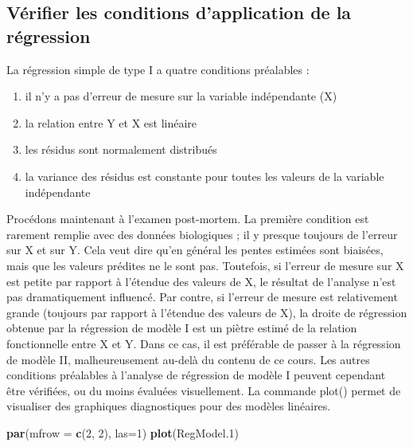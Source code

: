 \documentclass[12pt,]{book}
\newenvironment{Shaded}{\begin{snugshade}}{\end{snugshade}}
\newcommand{\DataTypeTok}[1]{\textcolor[rgb]{0.27,0.27,0.27}{#1}}
\newcommand{\DecValTok}[1]{\textcolor[rgb]{0.06,0.06,0.06}{#1}}
\newcommand{\FloatTok}[1]{\textcolor[rgb]{0.06,0.06,0.06}{#1}}
\newcommand{\KeywordTok}[1]{\textcolor[rgb]{0.27,0.27,0.27}{\textbf{#1}}}
\newcommand{\NormalTok}[1]{#1}
\providecommand{\tightlist}{%
  \setlength{\itemsep}{0pt}\setlength{\parskip}{0pt}}
\begin{document}
\hypertarget{vuxe9rifier-les-conditions-dapplication-de-la-ruxe9gression}{%
\subsection{Vérifier les conditions d'application de la régression}\label{vuxe9rifier-les-conditions-dapplication-de-la-ruxe9gression}}

La régression simple de type I a quatre conditions préalables :

\begin{enumerate}
\def\labelenumi{\arabic{enumi}.}
\tightlist
\item
  il n'y a pas d'erreur de mesure sur la variable indépendante (X)
\item
  la relation entre Y et X est linéaire
\item
  les résidus sont normalement distribués
\item
  la variance des résidus est constante pour toutes les valeurs de la variable indépendante
\end{enumerate}

Procédons maintenant à l'examen post-mortem. La première
condition est rarement remplie avec des données biologiques ; il y
presque toujours de l'erreur sur X et sur Y. Cela veut dire qu'en
général les pentes estimées sont biaisées, mais que les valeurs prédites
ne le sont pas. Toutefois, si l'erreur de mesure sur X est petite par
rapport à l'étendue des valeurs de X, le résultat de l'analyse n'est pas
dramatiquement influencé. Par contre, si l'erreur de mesure est
relativement grande (toujours par rapport à l'étendue des valeurs de
X), la droite de régression obtenue par la régression de modèle I est
un piètre estimé de la relation fonctionnelle entre X et Y. Dans ce cas,
il est préférable de passer à la régression de modèle II,
malheureusement au-delà du contenu de ce cours.
Les autres conditions préalables à l'analyse de régression de modèle I
peuvent cependant être vérifiées, ou du moins évaluées visuellement.
La commande plot() permet de visualiser des graphiques
diagnostiques pour des modèles linéaires.

\begin{Shaded}
\begin{Highlighting}[]
\KeywordTok{par}\NormalTok{(}\DataTypeTok{mfrow =} \KeywordTok{c}\NormalTok{(}\DecValTok{2}\NormalTok{, }\DecValTok{2}\NormalTok{), }\DataTypeTok{las=}\DecValTok{1}\NormalTok{)}
\KeywordTok{plot}\NormalTok{(RegModel}\FloatTok{.1}\NormalTok{)}
\end{Highlighting}
\end{Shaded}
\end{document}
